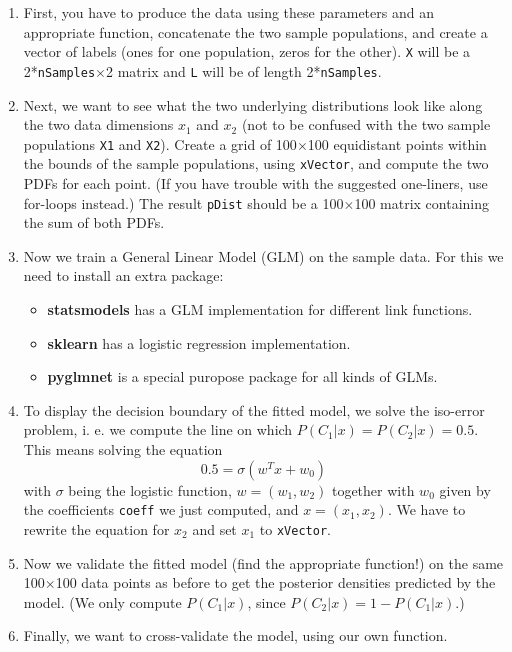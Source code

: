 \documentclass[10pt,a4paper,notitlepage]{report}
\begin{document}
\begin{enumerate}

\item First, you have to produce the data using these parameters and an appropriate function, concatenate the two sample populations, and create a vector of labels (ones for one population, zeros for the other). \texttt{X} will be a 2*\texttt{nSamples}$\times$2 matrix and \texttt{L} will be of length 2*\texttt{nSamples}.

\item Next, we want to see what the two underlying distributions look like along the two data dimensions $x_1$ and $x_2$ (not to be confused with the two sample populations \texttt{X1} and \texttt{X2}). Create a grid of 100$\times$100 equidistant points within the bounds of the sample populations, using \texttt{xVector}, and compute the two PDFs for each point. (If you have trouble with the suggested one-liners, use for-loops instead.) The result \texttt{pDist} should be a 100$\times$100 matrix containing the sum of both PDFs.

\item Now we train a General Linear Model (GLM) on the sample data. For this we need to install an extra package:
\begin{itemize}
  \item \textbf{statsmodels} has a GLM implementation for different link functions.
  \item \textbf{sklearn} has a logistic regression implementation.
  \item \textbf{pyglmnet} is a special puropose package for all kinds of GLMs.
\end{itemize}


\item To display the decision boundary of the fitted model, we solve the iso-error problem, i. e. we compute the line on which $P(C_1|x) = P(C_2|x) = 0.5$. This means solving the equation
\begin{equation*}
0.5 = \sigma (w^Tx+w_0)
\end{equation*}
with $\sigma$ being the logistic function, $w=(w_1,w_2)$ together with $w_0$ given by the coefficients \texttt{coeff} we just computed, and $x=(x_1,x_2)$. We have to rewrite the equation for $x_2$ and set $x_1$ to \texttt{xVector}.

\item Now we validate the fitted model (find the appropriate function!) on the same 100$\times$100 data points as before to get the posterior densities predicted by the model. (We only compute $P(C_1|x)$, since $P(C_2|x)=1-P(C_1|x)$.)

\item Finally, we want to cross-validate the model, using our own function.

\end{enumerate}
\end{document}
